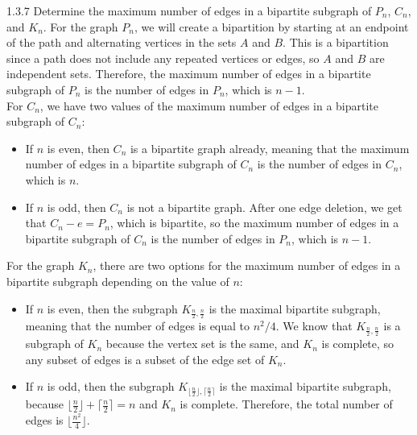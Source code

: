 \documentclass[10pt]{extarticle}
\begin{document}
  \begin{problem}{1.3.7}
    Determine the maximum number of edges in a bipartite subgraph of $P_n$, $C_n$, and $K_n$.
    \tcblower
    For the graph $P_n$, we will create a bipartition by starting at an endpoint of the path and alternating vertices in the sets $A$ and $B$. This is a bipartition since a path does not include any repeated vertices or edges, so $A$ and $B$ are independent sets. Therefore, the maximum number of edges in a bipartite subgraph of $P_n$ is the number of edges in $P_n$, which is $n-1$.\\

    For $C_n$, we have two values of the maximum number of edges in a bipartite subgraph of $C_n$:
    \begin{itemize}
      \item If $n$ is even, then $C_n$ is a bipartite graph already, meaning that the maximum number of edges in a bipartite subgraph of $C_n$ is the number of edges in $C_n$, which is $n$.
      \item If $n$ is odd, then $C_n$ is not a bipartite graph. After one edge deletion, we get that $C_n - e = P_n$, which is bipartite, so the maximum number of edges in a bipartite subgraph of $C_n$ is the number of edges in $P_n$, which is $n-1$.
    \end{itemize}
    For the graph $K_n$, there are two options for the maximum number of edges in a bipartite subgraph depending on the value of $n$:
    \begin{itemize}
      \item If $n$ is even, then the subgraph $K_{\frac{n}{2},\frac{n}{2}}$ is the maximal bipartite subgraph, meaning that the number of edges is equal to $n^2/4$. We know that $K_{\frac{n}{2},\frac{n}{2}}$ is a subgraph of $K_n$ because the vertex set is the same, and $K_n$ is complete, so any subset of edges is a subset of the edge set of $K_n$.
      \item If $n$ is odd, then the subgraph $K_{\lfloor \frac{n}{2}\rfloor, \lceil \frac{n}{2}\rceil}$ is the maximal bipartite subgraph, because $\lfloor \frac{n}{2}\rfloor + \lceil \frac{n}{2}\rceil = n$ and $K_n$ is complete. Therefore, the total number of edges is $\lfloor \frac{n^2}{4}\rfloor$.
    \end{itemize}
  \end{problem}
\end{document}
